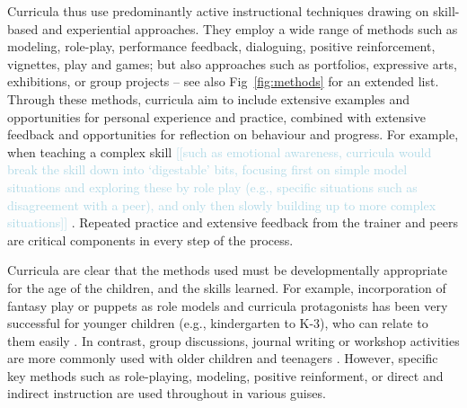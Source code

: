\documentclass[prodmode,acmtochi]{acmsmall}
\newcommand{\todo}[1]{\textrm{\textrm{\textcolor{LightBlue}{[[#1]]} } } }
\begin{document}

  

Curricula thus use predominantly active instructional techniques drawing on skill-based and experiential approaches. They employ a wide range of methods such as modeling, role-play, performance feedback, dialoguing, positive reinforcement, vignettes, play and games; but also approaches such as portfolios, expressive arts, exhibitions, or group projects -- see also Fig~\ref{fig:methods} for an extended list. Through these methods, curricula aim to include extensive examples and opportunities for personal experience and practice, combined with extensive feedback and opportunities for reflection on behaviour and progress. For example, when teaching a complex skill \todo{such as emotional awareness, curricula would break the skill down into `digestable' bits, focusing first on simple model situations and exploring these by role play (e.g., specific situations such as disagreement with a peer),  and only then slowly building up to more complex situations}. Repeated practice and extensive feedback from the trainer and peers are critical components in every step of the process. 

Curricula are clear that the methods used must be developmentally appropriate for the age of the children, and the skills learned. For example, incorporation of fantasy play or puppets as role models and curricula protagonists has been very successful for younger children (e.g., kindergarten to K-3), who can relate to them easily  \cite{Webster-Stratton2004}. In contrast, group discussions, journal writing or workshop activities are more commonly used with older children and teenagers \cite{dejong1994}. However, specific key methods such as role-playing, modeling, positive reinforment, or direct and indirect instruction are used throughout in various guises. 
\end{document}
